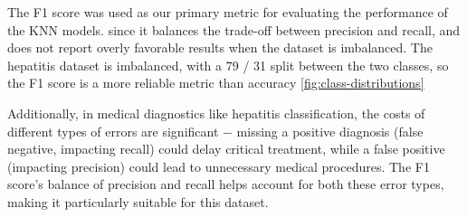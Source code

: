 The F1 score was used as our primary metric for evaluating the performance of the KNN models.
since it balances the trade-off between precision and recall, and does not report overly favorable results when the dataset is imbalanced.
The hepatitis dataset is imbalanced, with a 79 / 31 split between the two classes, so the F1 score is a more reliable metric than accuracy \autoref{fig:class-distributions}

Additionally, in medical diagnostics like hepatitis classification, the costs of different types of errors are significant $-$ 
missing a positive diagnosis (false negative, impacting recall) could delay critical treatment,
while a false positive (impacting precision) could lead to unnecessary medical procedures.
The F1 score's balance of precision and recall helps account for both these error types, making it particularly suitable for this dataset.